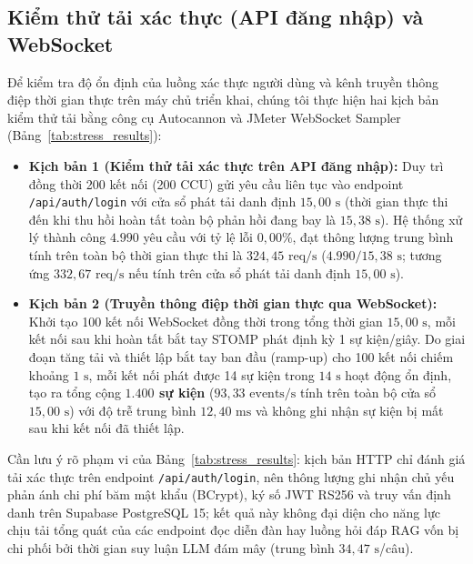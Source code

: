 \documentclass{IEEEtran}
\begin{document}
\subsection{Kiểm thử tải xác thực (API đăng nhập) và WebSocket}
Để kiểm tra độ ổn định của luồng xác thực người dùng và kênh truyền thông điệp thời gian thực trên máy chủ triển khai, chúng tôi thực hiện hai kịch bản kiểm thử tải bằng công cụ Autocannon và JMeter WebSocket Sampler (Bảng~\ref{tab:stress_results}):
\begin{itemize}
    \item \textbf{Kịch bản 1 (Kiểm thử tải xác thực trên API đăng nhập):} Duy trì đồng thời 200 kết nối (200 CCU) gửi yêu cầu liên tục vào endpoint \texttt{/api/auth/login} với cửa sổ phát tải danh định $15{,}00\text{~s}$ (thời gian thực thi đến khi thu hồi hoàn tất toàn bộ phản hồi đang bay là $15{,}38\text{~s}$). Hệ thống xử lý thành công $4.990$ yêu cầu với tỷ lệ lỗi $0{,}00\%$, đạt thông lượng trung bình tính trên toàn bộ thời gian thực thi là \textbf{$324{,}45\text{~req/s}$} ($4.990 / 15{,}38\text{~s}$; tương ứng $332{,}67\text{~req/s}$ nếu tính trên cửa sổ phát tải danh định $15{,}00\text{~s}$).
    \item \textbf{Kịch bản 2 (Truyền thông điệp thời gian thực qua WebSocket):} Khởi tạo 100 kết nối WebSocket đồng thời trong tổng thời gian $15{,}00\text{~s}$, mỗi kết nối sau khi hoàn tất bắt tay STOMP phát định kỳ 1 sự kiện/giây. Do giai đoạn tăng tải và thiết lập bắt tay ban đầu (ramp-up) cho 100 kết nối chiếm khoảng $1\text{~s}$, mỗi kết nối phát được 14 sự kiện trong $14\text{~s}$ hoạt động ổn định, tạo ra tổng cộng \textbf{$1.400$ sự kiện} ($93{,}33\text{~events/s}$ tính trên toàn bộ cửa sổ $15{,}00\text{~s}$) với độ trễ trung bình $12{,}40\text{~ms}$ và không ghi nhận sự kiện bị mất sau khi kết nối đã thiết lập.
\end{itemize}
Cần lưu ý rõ phạm vi của Bảng~\ref{tab:stress_results}: kịch bản HTTP chỉ đánh giá tải xác thực trên endpoint \texttt{/api/auth/login}, nên thông lượng ghi nhận chủ yếu phản ánh chi phí băm mật khẩu (BCrypt), ký số JWT RS256 và truy vấn định danh trên Supabase PostgreSQL 15; kết quả này không đại diện cho năng lực chịu tải tổng quát của các endpoint đọc diễn đàn hay luồng hỏi đáp RAG vốn bị chi phối bởi thời gian suy luận LLM đám mây (trung bình $34{,}47\text{~s}$/câu).
\end{document}
